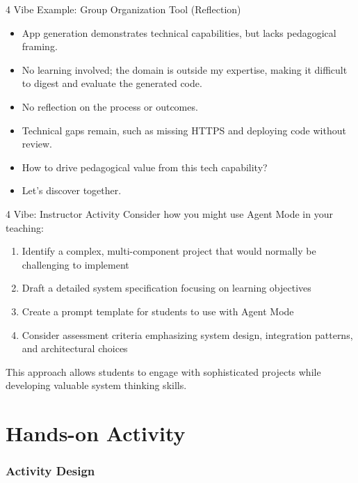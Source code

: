 \documentclass[xcolor=dvipsnames, aspectratio=169]{beamer}
\newcommand{\footername}{AI in Programming Education}
\newcommand{\setfooter}[2]{\renewcommand{\footername}{\href{#2}{#1}}}
\begin{document}
\begin{frame}{4 Vibe Example: Group Organization Tool (Reflection)}
\begin{itemize}
  \item App generation demonstrates technical capabilities, but lacks pedagogical framing.
  \item No learning involved; the domain is outside my expertise, making it difficult to digest and evaluate the generated code.
  \item No reflection on the process or outcomes.
  \item Technical gaps remain, such as missing HTTPS and deploying code without review.
\end{itemize}

\begin{alertbox}
\begin{itemize}
  \item How to drive pedagogical value from this tech capability? 
  \item Let's discover together.
\end{itemize}  
\end{alertbox}
\end{frame}

\begin{frame}{4 Vibe: Instructor Activity}
  Consider how you might use Agent Mode in your teaching:
  
  \begin{enumerate}
    \item Identify a complex, multi-component project that would normally be challenging to implement
    \item Draft a detailed system specification focusing on learning objectives
    \item Create a prompt template for students to use with Agent Mode
    \item Consider assessment criteria emphasizing system design, integration patterns, and architectural choices
  \end{enumerate}
  
  This approach allows students to engage with sophisticated projects while developing valuable system thinking skills.
\end{frame}

\part[Hands-on Activity]{Hands-on Activity}
\section{Activity Design}
\setfooter{Hands-on Activity}{https://github.com/neu-ece-esl/ai-prog-workshop}
\end{document}

